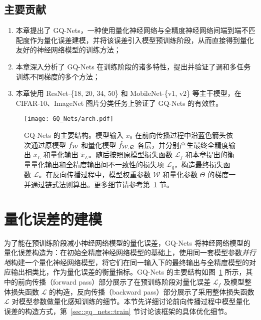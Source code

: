 \subsection{主要贡献}
\begin{enumerate}[1.]
  \item 本章提出了 GQ-Nets，一种使用量化神经网络与全精度神经网络间端到端不匹配度作为量化误差建模，并将该误差引入模型预训练阶段，从而直接得到量化友好的神经网络模型的训练方法；
  \item 本章深入分析了 GQ-Nets 在训练阶段的诸多特性，提出并验证了调和多任务训练不同梯度的多个方法；
  \item 本章使用 ResNet-\{18, 20, 34, 50\} 和 MobileNet-\{v1, v2\} 等主干模型，在 CIFAR-10、ImageNet 图片分类任务上验证了 GQ-Nets 的有效性。
\end{enumerate}
\begin{figure}[htb]
  \centering
  \texttt{[image: GQ\_Nets/arch.pdf]}
  \caption{GQ-Nets 的主要结构。模型输入 $x_0$ 在前向传播过程中沿蓝色箭头依次通过原模型 $f_{\mathcal{W}}$ 和量化模型 $\hat{f}_{\mathcal{W, Q}}$ 各层，并分别产生最终全精度输出 $x_L$ 和量化输出 $\tilde{x}_L$。随后按照原模型损失函数 $\mathcal{L}_f$ 和本章提出的衡量量化输出和全精度输出间不一致性的损失项 $\mathcal{L}_q$，构造最终损失函数 $\mathcal{L}$。在反向传播过程中，模型权重参数 $\mathcal{W}$ 和量化参数 $\Theta$ 的梯度一并通过链式法则算出。更多细节请参考第~\ref{sec::gq_nets::q_error} 节。}
  \label{img::gq_nets::arch}
\end{figure}

\section{量化误差的建模} \label{sec::gq_nets::q_error}
为了能在预训练阶段减小神经网络模型的量化误差，GQ-Nets 将神经网络模型的量化误差构造为：在初始全精度神经网络模型的基础上，使用同一套模型参数\emph{并行地}构建一个量化神经网络模型，将它们在同一输入下的最终输出与全精度模型的对应输出相类比，作为量化误差的衡量指标。GQ-Nets 的主要结构如图~\ref{img::gq_nets::arch} 所示，其中的前向传播（forward pass）部分展示了在预训练阶段对量化误差 $\mathcal{L}_f$ 及模型整体损失函数 $\mathcal{L}$ 的构造，反向传播（backward pass）部分展示了采用整体损失函数 $\mathcal{L}$ 对模型参数做量化感知训练的细节。本节先详细讨论前向传播过程中模型量化误差的构造方式，第~\ref{sec::gq_nets::train} 节讨论该框架的具体优化细节。

